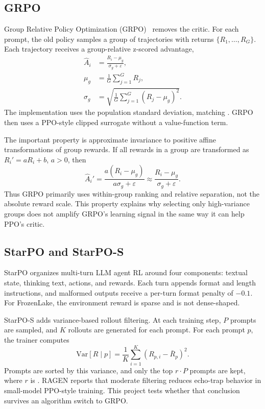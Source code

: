 \subsection{GRPO}

Group Relative Policy Optimization (GRPO)~\citep{shao2024deepseekmath} removes the critic. For each prompt, the old policy samples a group of trajectories with returns \(\{R_1,\ldots,R_G\}\). Each trajectory receives a group-relative z-scored advantage,
\begin{align}
\hat{A}_i &= \frac{R_i-\mu_g}{\sigma_g+\varepsilon}, \\
\mu_g &= \frac{1}{G}\sum_{j=1}^{G}R_j, \\
\sigma_g &= \sqrt{\frac{1}{G}\sum_{j=1}^{G}(R_j-\mu_g)^2}.
\end{align}
The implementation uses the population standard deviation, matching . GRPO then uses a PPO-style clipped surrogate without a value-function term.

The important property is approximate invariance to positive affine transformations of group rewards. If all rewards in a group are transformed as \(R_i' = aR_i+b\), \(a>0\), then
\begin{equation}
\hat{A}_i'
= \frac{a(R_i-\mu_g)}{a\sigma_g+\varepsilon}
\approx \frac{R_i-\mu_g}{\sigma_g+\varepsilon}.
\end{equation}
Thus GRPO primarily uses within-group ranking and relative separation, not the absolute reward scale. This property explains why selecting only high-variance groups does not amplify GRPO's learning signal in the same way it can help PPO's critic.

\subsection{StarPO and StarPO-S}

StarPO organizes multi-turn LLM agent RL around four components: textual state, thinking text, actions, and rewards. Each turn appends format and length instructions, and malformed outputs receive a per-turn format penalty of \(-0.1\). For FrozenLake, the environment reward is sparse and is not dense-shaped.

StarPO-S adds variance-based rollout filtering. At each training step, \(P\) prompts are sampled, and \(K\) rollouts are generated for each prompt. For each prompt \(p\), the trainer computes
\begin{equation}
\mathrm{Var}[R \mid p]
= \frac{1}{K}\sum_{i=1}^{K}\left(R_{p,i}-\bar{R}_p\right)^2.
\end{equation}
Prompts are sorted by this variance, and only the top \(r \cdot P\) prompts are kept, where \(r\) is . RAGEN reports that moderate filtering reduces echo-trap behavior in small-model PPO-style training. This project tests whether that conclusion survives an algorithm switch to GRPO.
